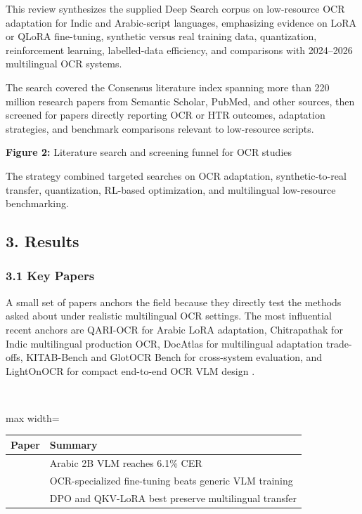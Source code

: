     
    This review synthesizes the supplied Deep Search corpus on low-resource OCR adaptation for Indic and Arabic-script languages, emphasizing evidence on LoRA or QLoRA fine-tuning, synthetic versus real training data, quantization, reinforcement learning, labelled-data efficiency, and comparisons with 2024–2026 multilingual OCR systems.
    
    
    The search covered the Consensus literature index spanning more than 220 million research papers from Semantic Scholar, PubMed, and other sources, then screened for papers directly reporting OCR or HTR outcomes, adaptation strategies, and benchmark comparisons relevant to low-resource scripts.
    
    
    \textbf{Figure 2:} Literature search and screening funnel for OCR studies
    
    
    The strategy combined targeted searches on OCR adaptation, synthetic-to-real transfer, quantization, RL-based optimization, and multilingual low-resource benchmarking.
    
    
    \subsection*{3. Results}
    
    
    \subsubsection*{3.1 Key Papers}
    
    
    A small set of papers anchors the field because they directly test the methods asked about under realistic multilingual OCR settings. The most influential recent anchors are QARI-OCR for Arabic LoRA adaptation, Chitrapathak for Indic multilingual production OCR, DocAtlas for multilingual adaptation trade-offs, KITAB-Bench and GlotOCR Bench for cross-system evaluation, and LightOnOCR for compact end-to-end OCR VLM design  \cite{Wasfy2025QARI-OCR:} \cite{Faraz2026Designing} \cite{Heakl2026DocAtlas:} \cite{Heakl2025KITAB-Bench:} \cite{Kargaran2026GlotOCR} \cite{Taghadouini2026LightOnOCR:}.
    
    
    \mbox{}\\
    \begin{adjustbox}{max width=\textwidth}
    \begin{tabular}{p{8.0cm} | p{8.0cm}}
    \hline
    Paper & Summary \\
    \hline
    \cite{Wasfy2025QARI-OCR:} & Arabic 2B VLM reaches 6.1\% CER  \cite{Wasfy2025QARI-OCR:} \\
    \cite{Faraz2026Designing} & OCR-specialized fine-tuning beats generic VLM training  \cite{Faraz2026Designing} \\
    \cite{Heakl2026DocAtlas:} & DPO and QKV-LoRA best preserve multilingual transfer  \cite{Heakl2026DocAtlas:} \\
    \hline
    \end{tabular}
    \end{adjustbox}
    
